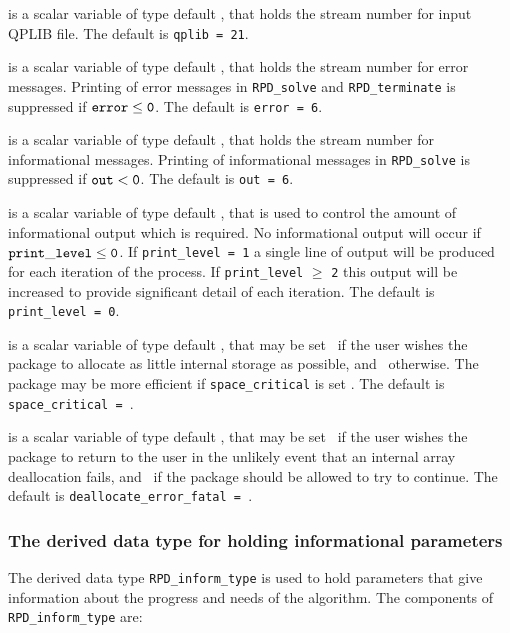 \documentclass{galahad}
\newcommand{\packagename}{RPD}
\begin{document}
\begin{description}
 is a scalar variable of type default \integer, that holds the
stream number for input QPLIB file.
The default is {\tt qplib = 21}.

 is a scalar variable of type default \integer, that holds the
stream number for error messages.
Printing of error messages in
{\tt \packagename\_solve} and {\tt \packagename\_terminate}
is suppressed if ${\tt error} \leq {\tt 0}$.
The default is {\tt error = 6}.

 is a scalar variable of type default \integer, that holds the
stream number for informational messages.
Printing of informational messages in
{\tt \packagename\_solve} is suppressed if ${\tt out} < {\tt 0}$.
The default is {\tt out = 6}.

 is a scalar variable of type default \integer,
that is used
to control the amount of informational output which is required. No
informational output will occur if ${\tt print\_level} \leq {\tt 0}$. If
{\tt print\_level = 1} a single line of output will be produced for each
iteration of the process. If {\tt print\_level} $\geq$ {\tt 2} this output
will be increased to provide significant detail of each iteration.
The default is {\tt print\_level = 0}.

 is a scalar variable of type default \logical, that
may be set \true\ if the user wishes the package to allocate as little
internal storage as possible, and \false\ otherwise. The package may
be more efficient if {\tt space\_critical} is set \false.
The default is {\tt space\_critical = \false}.

 is a scalar variable of type default \logical,
that may be set \true\ if the user wishes the package to return to the user
in the unlikely event that an internal array deallocation fails,
and \false\ if the package should be allowed to try to continue.
The default is {\tt deallocate\_error\_fatal = \false}.

\end{description}


\subsubsection{The derived data type for holding informational
 parameters}\label{typeinform}
The derived data type
{\tt \packagename\_inform\_type}
is used to hold parameters that give information about the progress and needs
of the algorithm. The components of
{\tt \packagename\_inform\_type}
are:
\end{document}
